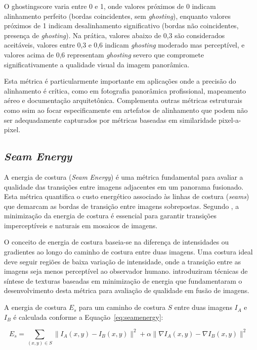 O \gls{ghostingscore} varia entre 0 e 1, onde valores próximos de 0 indicam alinhamento perfeito (bordas coincidentes, sem \textit{ghosting}), enquanto valores próximos de 1 indicam desalinhamento significativo (bordas não coincidentes, presença de \textit{ghosting}). Na prática, valores abaixo de 0,3 são considerados aceitáveis, valores entre 0,3 e 0,6 indicam \textit{ghosting} moderado mas perceptível, e valores acima de 0,6 representam \textit{ghosting} severo que compromete significativamente a qualidade visual da imagem panorâmica.

Esta métrica é particularmente importante em aplicações onde a precisão do alinhamento é crítica, como em fotografia panorâmica profissional, mapeamento aéreo e documentação arquitetônica. Complementa outras métricas estruturais como \gls{ssim} ao focar especificamente em artefatos de alinhamento que podem não ser adequadamente capturados por métricas baseadas em similaridade pixel-a-pixel.

\subsection*{\textit{Seam Energy}}

A energia de costura (\textit{Seam Energy}) é uma métrica fundamental para avaliar a qualidade das transições entre imagens adjacentes em um panorama fusionado. Esta métrica quantifica o custo energético associado às linhas de costura (\textit{seams}) que demarcam as bordas de transição entre imagens sobrepostas. Segundo , a minimização da energia de costura é essencial para garantir transições imperceptíveis e naturais em mosaicos de imagens.

O conceito de energia de costura baseia-se na diferença de intensidades ou gradientes ao longo do caminho de costura entre duas imagens. Uma costura ideal deve seguir regiões de baixa variação de intensidade, onde a transição entre as imagens seja menos perceptível ao observador humano.  introduziram técnicas de síntese de texturas baseadas em minimização de energia que fundamentaram o desenvolvimento desta métrica para avaliação de qualidade em fusão de imagens.

A energia de costura $E_s$ para um caminho de costura $S$ entre duas imagens $I_A$ e $I_B$ é calculada conforme a Equação~\ref{eq:seamenergy}:

\begin{equation}
\label{eq:seamenergy}
E_s = \sum_{(x,y) \in S} \|I_A(x,y) - I_B(x,y)\|^2 + \alpha \|\nabla I_A(x,y) - \nabla I_B(x,y)\|^2
\end{equation}

